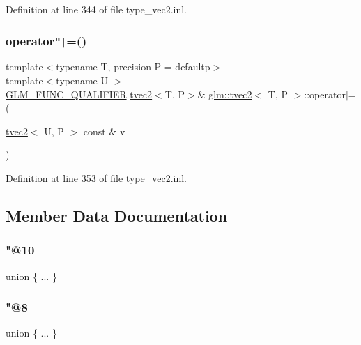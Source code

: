 Definition at line 344 of file type\+\_\+vec2.\+inl.

\mbox{\label{structglm_1_1tvec2_aa36fb52ee5d9c58525c1e82edfdadc70}} 
\subsubsection{\texorpdfstring{operator\texttt{"|}=()}{operator|=()}\hspace{0.1cm}{\footnotesize\ttfamily [6/6]}}
{\footnotesize\ttfamily template$<$typename T, precision P = defaultp$>$ \\
template$<$typename U $>$ \\
\mbox{\hyperlink{setup_8hpp_a33fdea6f91c5f834105f7415e2a64407}{G\+L\+M\+\_\+\+F\+U\+N\+C\+\_\+\+Q\+U\+A\+L\+I\+F\+I\+ER}} \mbox{\hyperlink{structglm_1_1tvec2}{tvec2}}$<$T, P$>$\& \mbox{\hyperlink{structglm_1_1tvec2}{glm\+::tvec2}}$<$ T, P $>$\+::operator$\vert$= (\begin{DoxyParamCaption}\item[{\mbox{\hyperlink{structglm_1_1tvec2}{tvec2}}$<$ U, P $>$ const \&}]{v }\end{DoxyParamCaption})}



Definition at line 353 of file type\+\_\+vec2.\+inl.



\subsection{Member Data Documentation}
\mbox{\label{structglm_1_1tvec2_a2a2f5db0cb3aadba4d5fa9b2a81b9c18}} 
\subsubsection{\texorpdfstring{"@10}{@10}}
{\footnotesize\ttfamily union \{ ... \} }

\mbox{\label{structglm_1_1tvec2_adb998a3f1036565ed838c5e88cfecba5}} 
\subsubsection{\texorpdfstring{"@8}{@8}}
{\footnotesize\ttfamily union \{ ... \} }

